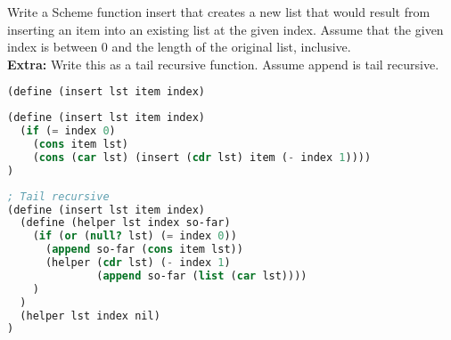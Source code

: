 \question Write a Scheme function insert that creates a new list that would
result from inserting an item into an existing list at the given index. Assume
that the given index is between 0 and the length of the original list,
inclusive.\\
\textbf{Extra:} Write this as a tail recursive function. Assume append is tail
recursive.

\begin{lstlisting}[language=Scheme]
(define (insert lst item index)
\end{lstlisting}

\begin{solution}[0.5in]
\begin{lstlisting}[language=Scheme]
(define (insert lst item index)
  (if (= index 0)
    (cons item lst)
    (cons (car lst) (insert (cdr lst) item (- index 1))))
)
\end{lstlisting}
\end{solution}

\begin{solution}
\begin{lstlisting}[language=Scheme]
; Tail recursive
(define (insert lst item index)
  (define (helper lst index so-far)
    (if (or (null? lst) (= index 0))
      (append so-far (cons item lst))
      (helper (cdr lst) (- index 1)
              (append so-far (list (car lst))))
    )
  )
  (helper lst index nil)
)
\end{lstlisting}
\end{solution}

